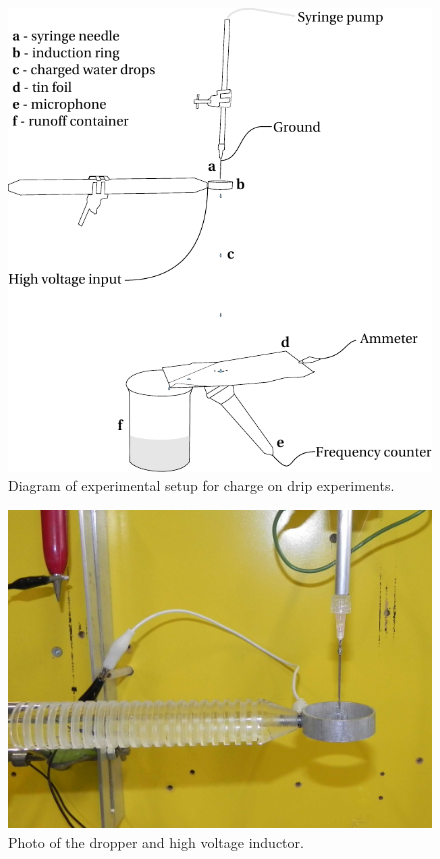     \begin{figure}[ht]
        \centering
        \includegraphics[scale=0.9]{content/appendices/chargedWaterDrops/graphics/ChargedDrips_Figure_Drawing_ExperimentalSetup}
        \caption{\label{ChargedDrips_Figure_Drawing_ExperimentalSetup}Diagram of experimental setup for charge on drip experiments.}
    \end{figure}
    
    \begin{figure}[ht]
        \centering
        \includegraphics[scale=0.12]{content/appendices/chargedWaterDrops/graphics/Photo_dripperExperiment_Inductor_draft.JPG}
        \caption{Photo of the dropper and high voltage inductor.}
        \label{Photo_dripperExperiment_Inductor}
    \end{figure}
    
